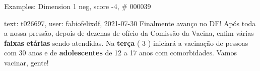 \begin{frame}{Examples: Dimension 1 neg, score -4, \# 000039}
\footnotesize
\begin{alertblock}{text: t026697, user: fabiofelixdf, 2021-07-30}
Finalmente avanço no DF!  Após toda a nossa pressão, depois de 
dezenas de ofício da Comissão da Vacina, enfim várias \textbf{faixas} 
\textbf{etárias} sendo atendidas. Na \textbf{terça} ( 3 ) iniciará a vacinação 
de pessoas com 30 anos e de \textbf{adolescentes} de 12 a 17 anos com 
comorbidades. Vamos vacinar, gente! 
\end{alertblock}
\end{frame}
